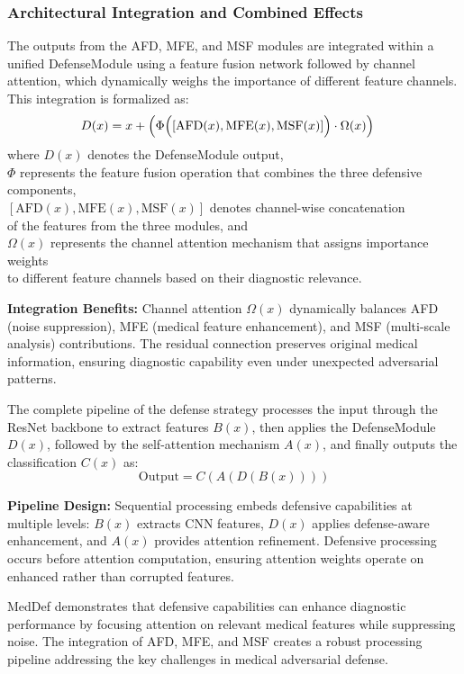 \documentclass[preprint,12pt]{elsarticle}
\begin{document}
\subsubsection{Architectural Integration and Combined Effects}
The outputs from the AFD, MFE, and MSF modules are integrated within a unified DefenseModule using a feature fusion network followed by channel attention, which dynamically weighs the importance of different feature channels. This integration is formalized as:
\begin{align}
D(x) &= x + \Bigl(
\Phi\Bigl([\text{AFD}(x), \text{MFE}(x), \text{MSF}(x)]\Bigr)\cdot\Omega(x)\Bigr)
\end{align}
where $D(x)$ denotes the DefenseModule output, \\
$\Phi$ represents the feature fusion operation that combines the three defensive components, \\
$[\text{AFD}(x), \text{MFE}(x), \text{MSF}(x)]$ denotes channel-wise concatenation \\
of the features from the three modules, and \\
$\Omega(x)$ represents the channel attention mechanism that assigns importance weights \\
to different feature channels based on their diagnostic relevance.

\textbf{Integration Benefits:} Channel attention $\Omega(x)$ dynamically balances AFD (noise suppression), MFE (medical feature enhancement), and MSF (multi-scale analysis) contributions. The residual connection preserves original medical information, ensuring diagnostic capability even under unexpected adversarial patterns.

The complete pipeline of the defense strategy processes the input through the ResNet backbone to extract features $B(x)$, then applies the DefenseModule $D(x)$, followed by the self-attention mechanism $A(x)$, and finally outputs the classification $C(x)$ as:
\begin{equation}
\text{Output} = C(A(D(B(x))))
\end{equation}

\textbf{Pipeline Design:} Sequential processing embeds defensive capabilities at multiple levels: $B(x)$ extracts CNN features, $D(x)$ applies defense-aware enhancement, and $A(x)$ provides attention refinement. Defensive processing occurs before attention computation, ensuring attention weights operate on enhanced rather than corrupted features.

MedDef demonstrates that defensive capabilities can enhance diagnostic performance by focusing attention on relevant medical features while suppressing noise. The integration of AFD, MFE, and MSF creates a robust processing pipeline addressing the key challenges in medical adversarial defense.
\end{document}
